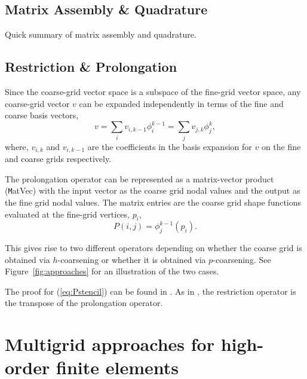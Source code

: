 \documentclass[smallcondensed,final]{svjour3}     %
\begin{document}
\subsection{Matrix Assembly \& Quadrature} %
\label{sub:matrix_assembly_&_quadrature}

Quick summary of matrix assembly and quadrature.



\subsection{Restriction \& Prolongation} %
\label{sub:restriction_&_prolongation}
Since the coarse-grid vector space is a subspace of the fine-grid vector space, any coarse-grid vector $v$ can be expanded independently in terms of the fine and coarse basis vectors, 
\begin{equation}
	v = \sum_i v_{i,k-1}\phi_i^{k-1} = \sum_j v_{j,k}\phi_j^k, 
\end{equation}
where, $v_{i,k}$ and $v_{i,k-1}$ are the coefficients in the basis expansion for $v$ on the fine and coarse grids respectively. 

The prolongation operator can be represented as a matrix-vector product ({\texttt MatVec}) with the input vector as the coarse grid nodal values and the output as the fine grid nodal values. The matrix entries are the coarse grid shape functions evaluated at the fine-grid vertices, $p_i$,
\begin{equation}
	\label{eq:Pstencil}
	P(i,j) = \phi_j^{k-1}(p_i). 
\end{equation}

This gives rise to two different operators depending on whether the coarse grid is obtained via $h$-coarsening or whether it is obtained via $p$-coarsening. See Figure~\ref{fig:approaches} for an illustration of the two cases.

The proof for (\ref{eq:Pstencil}) can be found in \cite{SampathBiros10}. As in \cite{SampathBiros10}, the restriction operator is the transpose of the prolongation operator. 



\section{Multigrid approaches for high-order finite elements}
\label{sec:approaches}
\end{document}
